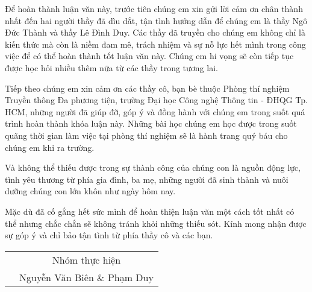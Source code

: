 
 
\begin{acknowledgements}      

Để hoàn thành luận văn này, trước tiên chúng em xin gửi lời cảm ơn chân thành nhất đến hai người thầy đã dìu dắt, tận tình hướng dẫn để chúng em là thầy Ngô Đức Thành và thầy Lê Đình Duy. Các thầy đã truyền cho chúng em không chỉ là kiến thức mà còn là niềm đam mê, trách nhiệm và sự nỗ lực hết mình trong công việc để có thể hoàn thành tốt luận văn này. Chúng em hi vọng sẽ còn tiếp tục được học hỏi nhiều thêm nữa từ các thầy trong tương lai.

Tiếp theo chúng em xin cảm ơn các thầy cô, bạn bè thuộc Phòng thí nghiệm Truyền thông Đa phương tiện, trường Đại học Công nghệ Thông tin - ĐHQG Tp. HCM, những người đã giúp đỡ, góp ý và đồng hành với chúng em trong suốt quá trình hoàn thành khóa luận này. Những bài học chúng em học được trong suốt quãng thời gian làm việc tại phòng thí nghiệm sẽ là hành trang quý báu cho chúng em khi ra trường.

Và không thể thiếu được trong sự thành công của chúng con là nguồn động lực, tình yêu thương từ phía gia đình, ba mẹ, những người đã sinh thành và nuôi dưỡng chúng con lớn khôn như ngày hôm nay.

Mặc dù đã cố gắng hết sức mình để hoàn thiện luận văn một cách tốt nhất có thể nhưng chắc chắn sẽ không tránh khỏi những thiếu sót. Kính mong nhận được sự góp ý và chỉ bảo tận tình từ phía thầy cô và các bạn.

\FloatBarrier
\begin{table}
\begin{center}
	\begin{tabular}{p{6cm} c}
	 & Nhóm thực hiện \\
     & Nguyễn Văn Biên \& Phạm Duy \\
	\end{tabular}
\end{center}
\end{table}
\FloatBarrier

\end{acknowledgements}
  
